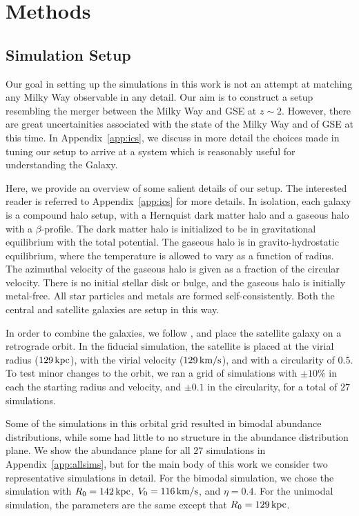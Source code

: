 \section{Methods}\label{sec:methods}
\subsection{Simulation Setup}\label{ssec:setup}
Our goal in setting up the simulations in this work is not an attempt at matching any Milky Way observable in any detail. Our aim is to construct a setup resembling the merger between the Milky Way and GSE at $z\sim2$. However, there are great uncertainities associated with the state of the Milky Way and of GSE at this time. In Appendix~\ref{app:ics}, we discuss in more detail the choices made in tuning our setup to arrive at a system which is reasonably useful for understanding the Galaxy.

Here, we provide an overview of some salient details of our setup. The interested reader is referred to Appendix~\ref{app:ics} for more details. In isolation, each galaxy is a compound halo setup, with a Hernquist dark matter halo and a gaseous halo with a $\beta$-profile. The dark matter halo is initialized to be in gravitational equilibrium with the total potential. The gaseous halo is in gravito-hydrostatic equilibrium, where the temperature is allowed to vary as a function of radius. The azimuthal velocity of the gaseous halo is given as a fraction of the circular velocity. There is no initial stellar disk or bulge, and the gaseous halo is initially metal-free. All star particles and metals are formed self-consistently. Both the central and satellite galaxies are setup in this way.

In order to combine the galaxies, we follow \citet{2021ApJ...923...92N}, and place the satellite galaxy on a retrograde orbit. In the fiducial simulation, the satellite is placed at the virial radius ($129\,\textrm{kpc}$), with the virial velocity ($129\,\textrm{km}/\textrm{s}$), and with a circularity of $0.5$. To test minor changes to the orbit, we ran a grid of simulations with $\pm10\%$ in each the starting radius and velocity, and $\pm0.1$ in the circularity, for a total of $27$ simulations.

Some of the simulations in this orbital grid resulted in bimodal abundance distributions, while some had little to no structure in the abundance distribution plane. We show the abundance plane for all $27$ simulations in Appendix~\ref{app:allsims}, but for the main body of this work we consider two representative simulations in detail. For the bimodal simulation, we chose the simulation with $R_0=142\,\textrm{kpc}$, $V_0=116\,\textrm{km}/\textrm{s}$, and $\eta=0.4$. For the unimodal simulation, the parameters are the same except that $R_0=129\,\textrm{kpc}$.


